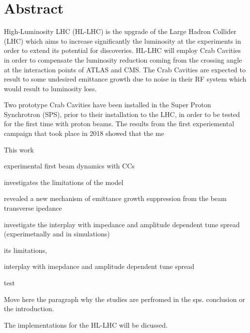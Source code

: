 \cleardoublepage
\chapter*{Abstract}

High-Luminosity LHC (HL-LHC) is the upgrade of the Large Hadron Collider (LHC) which aims to increase significantly the luminosity at the experiments in order to extend its potential for discoveries. HL-LHC will employ Crab Cavities in order to compensate the luminosity reduction coming from the crossing angle at the interaction points of ATLAS and CMS. The Crab Cavities are expected to result to some undesired emittance growth due to noise in their RF system which would result to luminosity loss. 

Two prototype Crab Cavities have been installed in the Super Proton Synchrotron (SPS), prior to their installation to the LHC, in order to be tested for the first time with proton beams.  The results from the first experiemental campaign that took place in 2018 showed that the me 


This work

experimental first beam dynamics with CCs

investigates the limitations of the model

revealed a new mechanism of emittance growth suppression from the beam transverse ipedance


investigate the interplay with impedance and amplitude dependent tune spread (experimetnally and in simulations)


its limitations, 

interplay with imepdance and amplitude dependent tune spread

test

Move here the paragraph why the studies are perfromed in the sps. conclusion or the introduction.



The implementations for the HL-LHC will be dicussed.